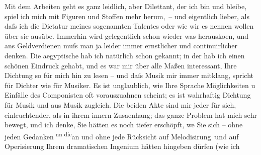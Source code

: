 \begin{ledgroupsized}[t]{13cm}
               Mit dem Arbeiten geht es ganz leidlich, aber Dilettant, der ich bin und bleibe, spiel
               ich mich mit Figuren und Stoffen mehr herum, – und eigentlich lieber, als daſs ich
               die Dictatur meines sogenannten Talentes oder wie wir es nennen wollen über sie
               ausübe. Immerhin wird gelegentlich schon wieder was herausko{\geminationm}en, und ans Geldverdienen muſs man ja leider immer
               ernstlicher und continuirlicher denken.\pend
           \pstart
           Die aegyptische hab ich
               natürlich schon gekannt; in der \label{K_L02504_1v}\label{K_L02504_1h} hab
               ich einen schönen Eindruck gehabt, und es war mir über alle Maßen interessant, Ihre
               Dichtung so für mich hin zu lesen – und daſs Musik mir immer mitklang, spricht für
               Dichter wie für Musiker. Es ist unglaublich, wie Ihre Sprache Möglichkeiten u
               Einfälle des Componisten oft vorauszuahnen scheint; es ist wahrhaftig Dichtung für
               Musik und aus Musik zugleich. Die beiden Akte sind mir {\pb}jeder für sich, einleuchtender, als in ihrem innern Zusa{\geminationm}enhang; das ganze Problem hat mich sehr bewegt, und ich
               denke, Sie hätten es noch tiefer erschöpft, we{\geminationn} Sie sich
               – ohne jeden Gedanken \substVorne{}\textsuperscript{an die}{\allowbreak}\substDazwischen{}an\substHinten{} un\textcolor{gray}{d} ohne jede Rücksicht auf Melodisirung \substVorne{}\textsuperscript{,}\substDazwischen{}un\textcolor{gray}{d}\substHinten{} auf Operisierung Ihrem dramatischen Ingenium hätten hingeben dürfen (wie ich

\end{ledgroupsized}
